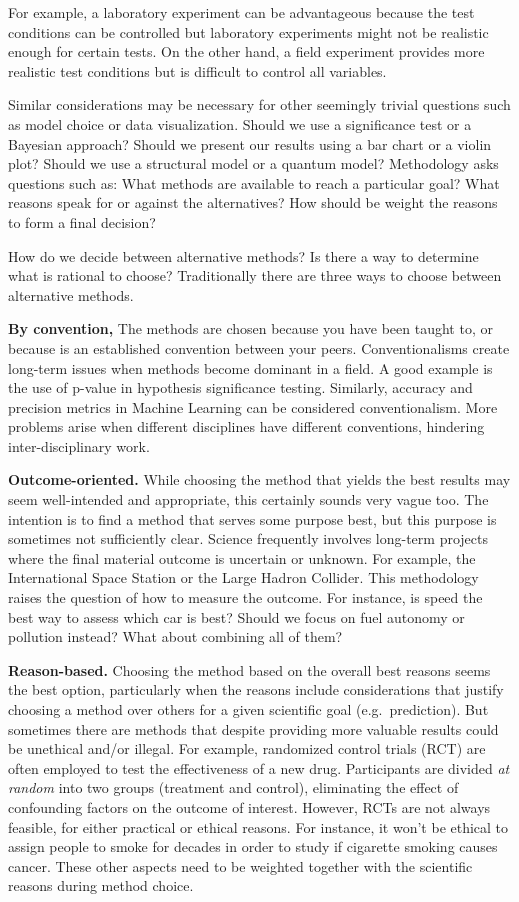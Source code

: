 \documentclass[
  12pt,
]{book}
\begin{document}
For example, a laboratory experiment can be advantageous because the test conditions can be controlled but laboratory experiments might not be realistic enough for certain tests. On the other hand, a field experiment provides more realistic test conditions but is difficult to control all variables.

Similar considerations may be necessary for other seemingly trivial questions such as model choice or data visualization. Should we use a significance test or a Bayesian approach? Should we present our results using a bar chart or a violin plot? Should we use a structural model or a quantum model? Methodology asks questions such as: What methods are available to reach a particular goal? What reasons speak for or against the alternatives? How should be weight the reasons to form a final decision?

How do we decide between alternative methods? Is there a way to determine what is rational to choose?
Traditionally there are three ways to choose between alternative methods.

\textbf{By convention,} The methods are chosen because you have been taught to, or because is an established convention between your peers. Conventionalisms create long-term issues when methods become dominant in a field. A good example is the use of p-value in hypothesis significance testing. Similarly, accuracy and precision metrics in Machine Learning can be considered conventionalism. More problems arise when different disciplines have different conventions, hindering inter-disciplinary work.

\textbf{Outcome-oriented.} While choosing the method that yields the best results may seem well-intended and appropriate, this certainly sounds very vague too. The intention is to find a method that serves some purpose best, but this purpose is sometimes not sufficiently clear. Science frequently involves long-term projects where the final material outcome is uncertain or unknown. For example, the International Space Station or the Large Hadron Collider. This methodology raises the question of how to measure the outcome. For instance, is speed the best way to assess which car is best? Should we focus on fuel autonomy or pollution instead? What about combining all of them?

\textbf{Reason-based.} Choosing the method based on the overall best reasons seems the best option, particularly when the reasons include considerations that justify choosing a method over others for a given scientific goal (e.g.~prediction). But sometimes there are methods that despite providing more valuable results could be unethical and/or illegal. For example, randomized control trials (RCT) are often employed to test the effectiveness of a new drug. Participants are divided \emph{at random} into two groups (treatment and control), eliminating the effect of confounding factors on the outcome of interest. However, RCTs are not always feasible, for either practical or ethical reasons. For instance, it won't be ethical to assign people to smoke for decades in order to study if cigarette smoking causes cancer. These other aspects need to be weighted together with the scientific reasons during method choice.
\end{document}
